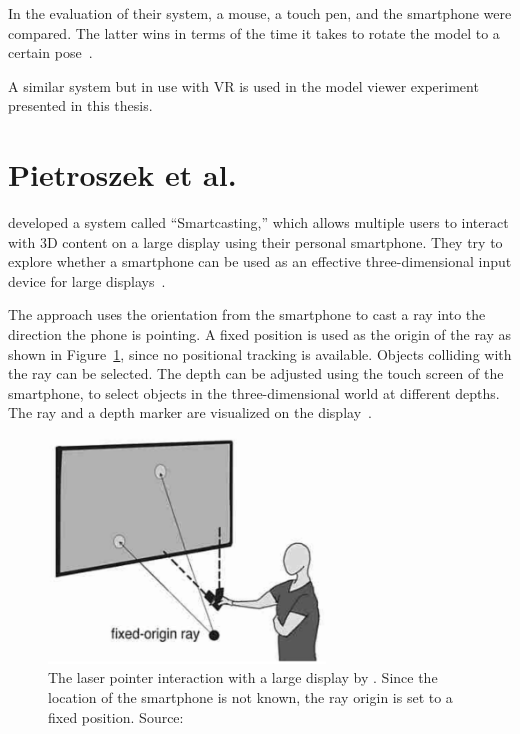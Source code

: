 In the evaluation of their system, a mouse, a touch pen, and the smartphone were compared. The latter wins in terms of the time it takes to rotate the model to a certain pose~\cite[140]{Katzakis.2010}.

A similar system but in use with \gls{VR} is used in the model viewer experiment presented in this thesis.

\section{Pietroszek et al.}\label{section:pietroszek-2014}
\citeauthor{Pietroszek.2014} developed a system called \enquote{Smartcasting,} which allows multiple users to interact with 3D content on a large display using their personal smartphone. They try to explore whether a smartphone can be used as an effective three-dimensional input device for large displays~\cite[119]{Pietroszek.2014}.

The approach uses the orientation from the smartphone to cast a ray into the direction the phone is pointing. A fixed position is used as the origin of the ray as shown in Figure~\ref{fig:pietroszek-2014}, since no positional tracking is available. Objects colliding with the ray can be selected. The depth can be adjusted using the touch screen of the smartphone, to select objects in the three-dimensional world at different depths. The ray and a depth marker are visualized on the display~\cite[121]{Pietroszek.2014}.

\begin{figure}[H]%
  \centering%
  \includegraphics[height=6cm]{figures/related_work/pietroszek_2014_laser_pointer.png}%
  \caption[Laser pointer implementation by Pietroszek et al.]{
  The laser pointer interaction with a large display by \citeauthor{Pietroszek.2014}. Since the location of the smartphone is not known, the ray origin is set to a fixed position.
  \newline{}
  Source:~\cite[Figure 3]{Pietroszek.2014}}\label{fig:pietroszek-2014}
\end{figure}

